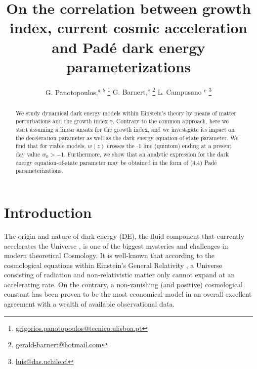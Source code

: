 \documentclass[aps,prd,amsmath,amssymb]{revtex4}
\begin{document}
\title{On the correlation between growth index, current cosmic acceleration \\ and Pad{\'e} dark energy parameterizations}


\author{
G. Panotopoulos,{${}^{a,b}$
\footnote{
\href{mailto:grigorios.panotopoulos@tecnico.ulisboa.pt}{grigorios.panotopoulos@tecnico.ulisboa.pt}
}
G. Barnert,{${}^{c}$
\footnote{
\href{mailto:gerald-barnert@hotmail.com}{gerald-barnert@hotmail.com} 
}
}
L. Campusano {${}^{c}$
\footnote{
\href{mailto:luis@das.uchile.cl}{luis@das.uchile.cl} 
}
}
}
}


\address{
${}^a$ Centro de Astrof{\'i}sica e Gravita{\c c}{\~a}o-CENTRA, Instituto Superior T{\'e}cnico-IST, Universidade 
de Lisboa-UL, Av. Rovisco Pais, 1049-001 Lisboa, Portugal. \\
${}^b$ Departamento de Ciencias F{\'i}sicas, Universidad de la Frontera, Avenida Francisco Salazar, Temuco 01145, Chile. \\
${}^c$ Departamento de Astronom{\'i}a, FCFM, Universidad de Chile, Camino El Observatorio 1515, Las Condes, 
Santiago, Chile.
}



\begin{abstract}
We study dynamical dark energy models within Einstein's theory by means of matter perturbations and the growth 
index $\gamma$. Contrary to the common approach, here we start assuming a linear ansatz for the growth index, and we investigate its impact on the deceleration parameter as well as the dark energy equation-of-state parameter.
We find that for viable models, $w(z)$ crosses the -1 line (quintom) ending at a present day value $w_0 > -1$. 
Furthermore, we show that an analytic expression for the dark energy equation-of-state parameter may be obtained in 
the form of (4,4) Pad{\'e} parameterizations.
\end{abstract}


\maketitle



\section{Introduction}\label{Intro}

The origin and nature of dark energy (DE), the fluid component that currently accelerates the Universe \cite{SN1,SN2,turner}, is one of the biggest mysteries and challenges in modern theoretical Cosmology. It is well-known 
that according to the cosmological equations within Einstein's General Relativity \cite{GR}, a Universe consisting of radiation and non-relativistic matter only cannot expand at an accelerating rate. On the contrary, a non-vanishing (and positive) cosmological constant \cite{einstein,carroll} has been proven to be the most economical model in an overall excellent agreement with a wealth of available observational data.
\end{document}
